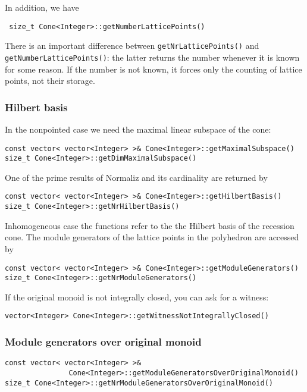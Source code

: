\documentclass[12pt,a4paper]{scrartcl}
\theoremstyle{definition}
\begin{document}
\begin{small}
 In addition, we have
 \begin{Verbatim} 
 size_t Cone<Integer>::getNumberLatticePoints()
 \end{Verbatim} 
There is an important difference between \verb|getNrLatticePoints()| and \verb|getNumberLatticePoints()|: the latter  returns the number whenever it is known for some reason. If the number is not known, it forces only the counting of lattice points, not their storage.

\subsubsection{Hilbert basis}

In the nonpointed case we need the maximal linear subspace of the cone:
\begin{Verbatim}
const vector< vector<Integer> >& Cone<Integer>::getMaximalSubspace()
size_t Cone<Integer>::getDimMaximalSubspace()
\end{Verbatim}

One of the prime results of Normaliz and its cardinality are returned by
\begin{Verbatim}
const vector< vector<Integer> >& Cone<Integer>::getHilbertBasis()
size_t Cone<Integer>::getNrHilbertBasis()
\end{Verbatim}
Inhomogeneous case the functions refer to the the Hilbert basis of the recession cone. The module generators of the lattice points in the polyhedron are accessed by
\begin{Verbatim}
const vector< vector<Integer> >& Cone<Integer>::getModuleGenerators()
size_t Cone<Integer>::getNrModuleGenerators()
\end{Verbatim}

If the original monoid is not integrally closed, you can ask for a witness:
\begin{Verbatim}
vector<Integer> Cone<Integer>::getWitnessNotIntegrallyClosed()
\end{Verbatim}

\subsubsection{Module generators over original monoid}

\begin{Verbatim}
const vector< vector<Integer> >& 
               Cone<Integer>::getModuleGeneratorsOverOriginalMonoid()
size_t Cone<Integer>::getNrModuleGeneratorsOverOriginalMonoid()
\end{Verbatim}


\end{small}
\end{document}

